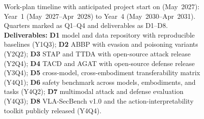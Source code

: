 \begin{figure}[h]
{%
}\vspace{-2ex}
\caption{Work-plan timeline with anticipated project start on (May~2027): Year~1 (May~2027--Apr~2028) to Year~4 (May~2030--Apr~2031). Quarters marked as Q1--Q4 and deliverables as D1--D8. {\textbf{Deliverables:} \textbf{D1} model and data repository with reproducible baselines (Y1Q3); \textbf{D2} ABBP with evasion and poisoning variants (Y2Q2); \textbf{D3} STAP and TTDA with open-source attack release (Y2Q4); \textbf{D4} TACD and AGAT with open-source defense release (Y3Q4); \textbf{D5} cross-model, cross-embodiment transferability matrix (Y4Q1); \textbf{D6} safety benchmark across models, embodiments, and tasks (Y4Q2); \textbf{D7} multimodal attack and defense evaluation (Y4Q3); \textbf{D8} VLA-SecBench v1.0 and the action-interpretability toolkit publicly released (Y4Q4).}}
\label{fig:workplan_timeline}
\end{figure}